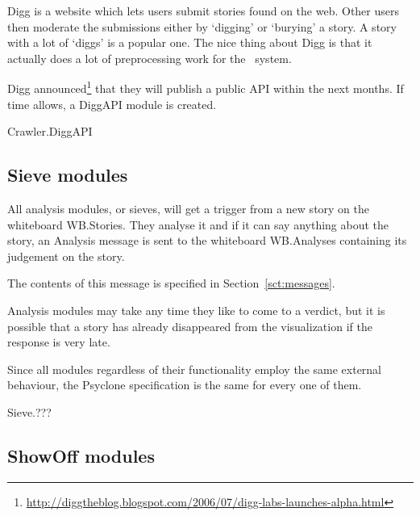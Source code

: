 Digg is a website which lets users submit stories found on the web. Other users
then moderate the submissions either by `digging' or `burying' a story. A story
with a lot of `diggs' is a popular one. The nice thing about Digg is that it
actually does a lot of preprocessing work for the \Amber\ system.

Digg
announced\footnote{\url{http://diggtheblog.blogspot.com/2006/07/digg-labs-launches-alpha.html}}
that they will publish a public API within the next months. If time allows, a
DiggAPI module is created.

\begin{module}{Crawler.DiggAPI}
\end{module}

% 
% 


\subsection{Sieve modules}

All analysis modules, or sieves, will get a trigger from a new story on the
whiteboard WB.Stories. They analyse it and if it can say anything about the
story, an Analysis message is sent to the whiteboard WB.Analyses containing its
judgement on the story.

The contents of this message is specified in Section~\ref{sct:messages}.

Analysis modules may take any time they like to come to a verdict, but it is
possible that a story has already disappeared from the visualization if the
response is very late.

Since all modules regardless of their functionality employ the same external
behaviour, the Psyclone specification is the same for every one of them.

\begin{module}{Sieve.???}
\end{module}

\subsection{ShowOff modules}

